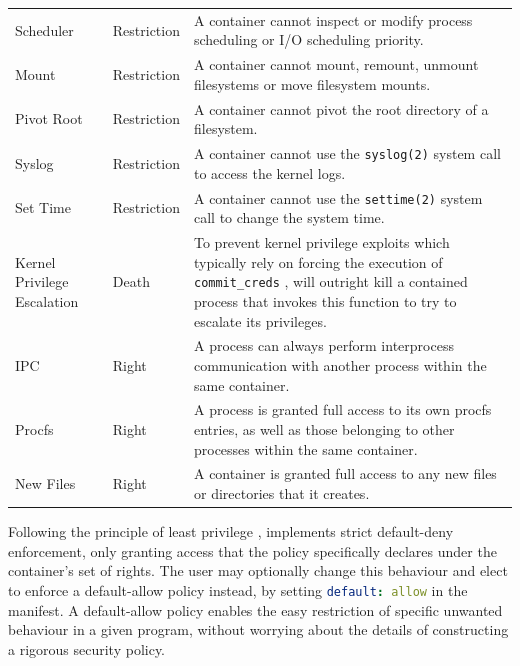 \begin{table}[htpb]
\begin{tabular}{llp{25em}}
  Scheduler & Restriction &
    A container cannot inspect or modify process scheduling or I/O scheduling priority. \\
  Mount & Restriction &
    A container cannot mount, remount, unmount filesystems or move filesystem mounts. \\
  Pivot Root & Restriction &
    A container cannot pivot the root directory of a filesystem. \\
  Syslog & Restriction &
    A container cannot use the \texttt{syslog(2)} system call to access the kernel logs. \\
  Set Time & Restriction &
    A container cannot use the \texttt{settime(2)} system call to change the system time. \\
  \midrule
  Kernel Privilege Escalation & Death &
    To prevent kernel privilege exploits which typically rely on forcing the execution of \texttt{commit\_creds} \cite{xin2018_container_security}, \bpfcontain{} will outright kill a contained process that invokes this function to try to escalate its privileges. \\
  \midrule
  IPC & Right &
    A process can always perform interprocess communication with another process within the same container. \\
  Procfs & Right &
    A process is granted full access to its own procfs entries, as well as those belonging to other processes within the same container. \\
  New Files & Right &
    A container is granted full access to any new files or directories that it creates. \\
  \bottomrule
  \end{tabular}
\end{table}

Following the principle of least privilege \cite{saltzer1975_protection},
\bpfcontain{} implements strict default-deny enforcement, only granting access
that the policy specifically declares under the container's set of rights. The
user may optionally change this behaviour and elect to enforce a default-allow
policy instead, by setting \lstinline[language=yaml]{default: allow} in the
manifest. A default-allow policy enables the easy restriction of specific
unwanted behaviour in a given program, without worrying about the details of
constructing a rigorous security policy.

